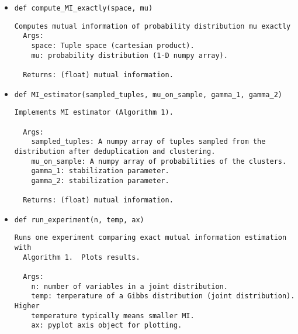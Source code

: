 {\begin{itemize}
\begin{verbatim}
  Args:
    space: a list of tuples that the joint distribution is supported on (e.g. a cartesian product).
    joint_dist: probability distribution (1-D numpy array) where each entry is a probability of a tuple.
    k: sample size.

  Returns:
    A numpy array of tuples sampled from the distribution after deduplication.
    A numpy array of probabilities of deduplicated tuples.
\end{verbatim}
  \item \verb!def compute_MI_exactly(space, mu)!
\begin{verbatim}
Computes mutual information of probability distribution mu exactly
  Args:
    space: Tuple space (cartesian product).
    mu: probability distribution (1-D numpy array).

  Returns: (float) mutual information.
\end{verbatim}
  \item \verb!def MI_estimator(sampled_tuples, mu_on_sample, gamma_1, gamma_2)!
\begin{verbatim}
Implements MI estimator (Algorithm 1).

  Args:
    sampled_tuples: A numpy array of tuples sampled from the distribution after deduplication and clustering.
    mu_on_sample: A numpy array of probabilities of the clusters.
    gamma_1: stabilization parameter.
    gamma_2: stabilization parameter.

  Returns: (float) mutual information.
\end{verbatim}
  \item \verb!def run_experiment(n, temp, ax)!
\begin{verbatim}
Runs one experiment comparing exact mutual information estimation with
  Algorithm 1.  Plots results.

  Args:
    n: number of variables in a joint distribution.
    temp: temperature of a Gibbs distribution (joint distribution). Higher
    temperature typically means smaller MI.
    ax: pyplot axis object for plotting.
\end{verbatim}
  \end{itemize}
}

